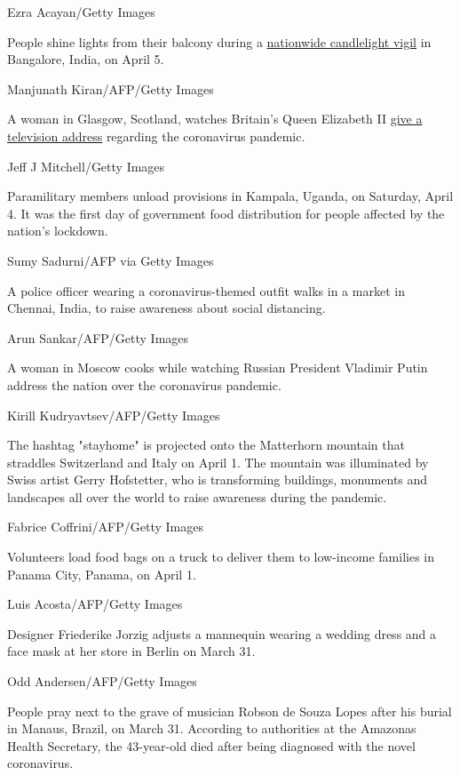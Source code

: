 Ezra Acayan/Getty Images

People shine lights from their balcony during a
\href{https://www.cnn.com/2020/04/05/world/india-coronavirus-candlelight-vigil/index.html}{nationwide
candlelight vigil} in Bangalore, India, on April 5.

Manjunath Kiran/AFP/Getty Images

A woman in Glasgow, Scotland, watches Britain's Queen Elizabeth II
\href{https://www.cnn.com/2020/04/05/uk/queen-elizabeth-ii-coronavirus-address-gbr-intl/index.html}{give
a television address} regarding the coronavirus pandemic.

Jeff J Mitchell/Getty Images

Paramilitary members unload provisions in Kampala, Uganda, on Saturday,
April 4. It was the first day of government food distribution for people
affected by the nation's lockdown.

Sumy Sadurni/AFP via Getty Images

A police officer wearing a coronavirus-themed outfit walks in a market
in Chennai, India, to raise awareness about social distancing.

Arun Sankar/AFP/Getty Images

A woman in Moscow cooks while watching Russian President Vladimir Putin
address the nation over the coronavirus pandemic.

Kirill Kudryavtsev/AFP/Getty Images

The hashtag "stayhome" is projected onto the Matterhorn mountain that
straddles Switzerland and Italy on April 1. The mountain was illuminated
by Swiss artist Gerry Hofstetter, who is transforming buildings,
monuments and landscapes all over the world to raise awareness during
the pandemic.

Fabrice Coffrini/AFP/Getty Images

Volunteers load food bags on a truck to deliver them to low-income
families in Panama City, Panama, on April 1.

Luis Acosta/AFP/Getty Images

Designer Friederike Jorzig adjusts a mannequin wearing a wedding dress
and a face mask at her store in Berlin on March 31.

Odd Andersen/AFP/Getty Images

People pray next to the grave of musician Robson de Souza Lopes after
his burial in Manaus, Brazil, on March 31. According to authorities at
the Amazonas Health Secretary, the 43-year-old died after being
diagnosed with the novel coronavirus.

